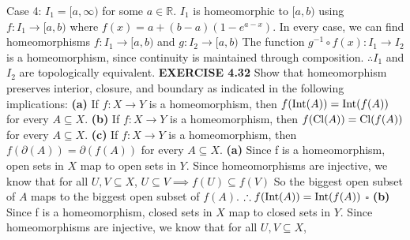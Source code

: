 \documentclass[12pt]{article}
\begin{document}
\newline \newline
Case 4: \(I_1 = [a,\infty)\) for some \(a \in \mathbb{R}\).
\newline
\(I_1\) is homeomorphic to \([a,b)\) using
\newline
\(f:I_1 \rightarrow [a,b)\) where \(f(x) = a + (b-a)(1-e^{a-x})\).
\newline \newline
In every case, we can find homeomorphisms \(f:I_1 \rightarrow [a,b)\) and \(g:I_2 \rightarrow [a,b)\)
\newline \newline
The function \(g^{-1} \circ f(x): I_1 \rightarrow I_2\) is a homeomorphism, since continuity is maintained through composition.
\newline
\(\therefore I_1\) and \(I_2\) are topologically equivalent.
\newpage
\noindent
\textbf{EXERCISE 4.32}
\newline
Show that homeomorphism preserves interior, closure, and boundary as indicated in the following implications:
\newline
\textbf{(a)} If \(f: X \rightarrow Y\) is a homeomorphism, then \(f(\textup{Int}(A)) = \textup{Int}(f(A))\) for every \(A \subseteq X\).
\newline
\textbf{(b)} If \(f: X \rightarrow Y\) is a homeomorphism, then \(f(\textup{Cl}(A)) = \textup{Cl}(f(A))\) for every \(A \subseteq X\).
\newline
\textbf{(c)} If \(f: X \rightarrow Y\) is a homeomorphism, then \(f(\partial(A)) = \partial(f(A))\) for every \(A \subseteq X\).
\newline \newline
\textbf{(a)}
Since f is a homeomorphism, open sets in \(X\) map to open sets in \(Y\). Since homeomorphisms are injective, we know that for all \(U,V \subseteq X\),
\newline
\(U \subseteq V \implies f(U) \subseteq f(V)\)
\newline
So the biggest open subset of \(A\) maps to the biggest open subset of \(f(A)\).
\newline
\(\therefore f(\textup{Int}(A)) = \textup{Int}(f(A))\)
\newline \(\square\) \newline \newline
\textbf{(b)}
Since f is a homeomorphism, closed sets in \(X\) map to closed sets in \(Y\). Since homeomorphisms are injective, we know that for all \(U,V \subseteq X\),
\newline
\end{document}
